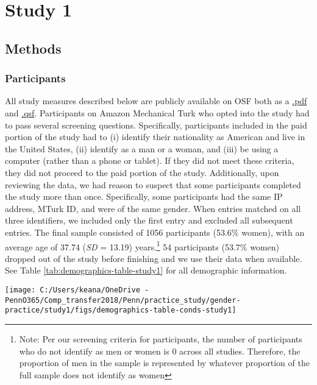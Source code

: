 \documentclass[letterpaper, nobind]{templates/ociamthesis}
\begin{document}
\hypertarget{study-1}{%
\section{Study 1}\label{study-1}}

\hypertarget{methods}{%
\subsection{Methods}\label{methods}}

\hypertarget{participants}{%
\subsubsection{Participants}\label{participants}}

All study measures described below are publicly available on OSF both as a \href{https://osf.io/hb9nw/}{.pdf} and \href{https://osf.io/ga24t/}{.qsf}. Participants on Amazon Mechanical Turk who opted into the study had to pass several screening questions. Specifically, participants included in the paid portion of the study had to (i) identify their nationality as American and live in the United States, (ii) identify as a man or a woman, and (iii) be using a computer (rather than a phone or tablet). If they did not meet these criteria, they did not proceed to the paid portion of the study. Additionally, upon reviewing the data, we had reason to suspect that some participants completed the study more than once. Specifically, some participants had the same IP address, MTurk ID, and were of the same gender. When entries matched on all three identifiers, we included only the first entry and excluded all subsequent entries. The final sample consisted of 1056 participants (53.6\% women), with an average age of 37.74 (\emph{SD} = 13.19) years.\footnote{Note: Per our screening criteria for participants, the number of participants who do not identify as men or women is 0 across all studies. Therefore, the proportion of men in the sample is represented by whatever proportion of the full sample does not identify as women} 54 participants (53.7\% women) dropped out of the study before finishing and we use their data when available. See Table \ref{tab:demographics-table-study1} for all demographic information.

\begin{center}\texttt{[image: C:/Users/keana/OneDrive - PennO365/Comp\_transfer2018/Penn/practice\_study/gender-practice/study1/figs/demographics-table-conds-study1]} \end{center}
\end{document}
